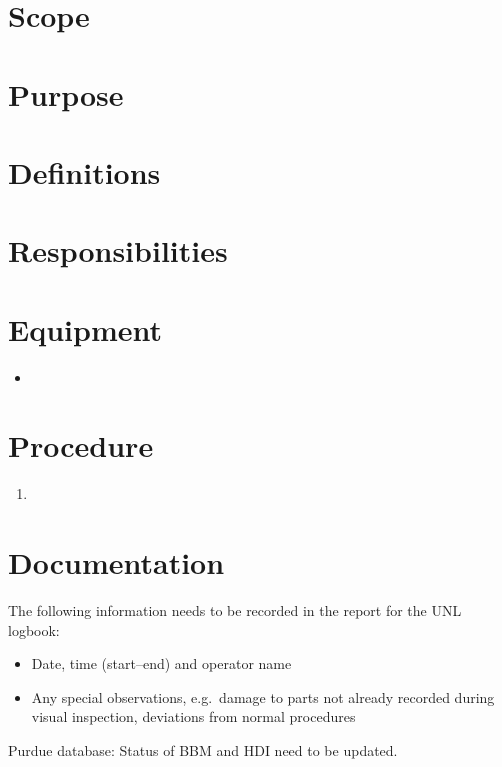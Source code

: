 \documentclass[12pt]{unlsilabsop}
\title{}
\date{}
\author{}
\begin{document}
\maketitle

\section{Scope}

\section{Purpose}

\section{Definitions}

\section{Responsibilities}

\section{Equipment}

\begin{itemize}
    \item 
\end{itemize}


\section{Procedure}

\begin{enumerate}
    \item 
\end{enumerate}

\section{Documentation}
The following information needs to be recorded in the report for the UNL logbook:
\begin{itemize}
    \item Date, time (start--end) and operator name
    \item Any special observations, e.g.~damage to parts not already recorded during visual inspection, deviations from normal procedures
\end{itemize}

Purdue database: Status of BBM and HDI need to be updated.
\end{document}
